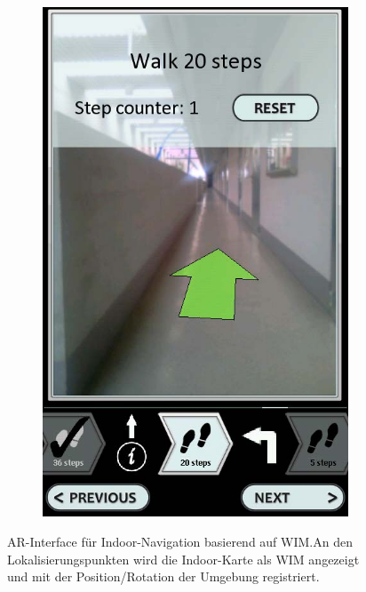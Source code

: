 \begin{figure}[t]
\begin{subfigure}{.18\textwidth}
        \includegraphics[width=\textwidth]{figures/mulloni2011_wim_e.png}
        \caption{}
        \label{sfig:mulloni2011_wim_e}
    \end{subfigure}
    \caption{AR-Interface für Indoor-Navigation basierend auf WIM.\@ An den Lokalisierungspunkten wird die Indoor-Karte als WIM angezeigt und mit der Position/Rotation der Umgebung registriert.}
    \label{fig:mulloni2011_wim}
\end{figure}

